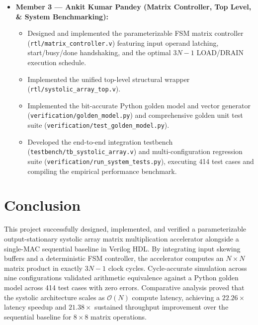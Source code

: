 \documentclass[conference]{IEEEtran}
\begin{document}
\begin{itemize}
    \item \textbf{Member 3 --- Ankit Kumar Pandey (Matrix Controller, Top Level, \& System Benchmarking):}
    \begin{itemize}
        \item Designed and implemented the parameterizable FSM matrix controller (\texttt{rtl/matrix\_controller.v}) featuring input operand latching, start/busy/done handshaking, and the optimal $3N-1$ LOAD/DRAIN execution schedule.
        \item Implemented the unified top-level structural wrapper (\texttt{rtl/systolic\_array\_top.v}).
        \item Implemented the bit-accurate Python golden model and vector generator (\texttt{verification/golden\_model.py}) and comprehensive golden unit test suite (\texttt{verification/test\_golden\_model.py}).
        \item Developed the end-to-end integration testbench (\texttt{testbench/tb\_systolic\_array.v}) and multi-configuration regression suite (\texttt{verification/run\_system\_tests.py}), executing 414 test cases and compiling the empirical performance benchmark.
    \end{itemize}
\end{itemize}

\section{Conclusion}
This project successfully designed, implemented, and verified a parameterizable output-stationary systolic array matrix multiplication accelerator alongside a single-MAC sequential baseline in Verilog HDL. By integrating input skewing buffers and a deterministic FSM controller, the accelerator computes an $N \times N$ matrix product in exactly $3N-1$ clock cycles. Cycle-accurate simulation across nine configurations validated arithmetic equivalence against a Python golden model across 414 test cases with zero errors. Comparative analysis proved that the systolic architecture scales as $\mathcal{O}(N)$ compute latency, achieving a $22.26\times$ latency speedup and $21.38\times$ sustained throughput improvement over the sequential baseline for $8 \times 8$ matrix operations.
\end{document}
